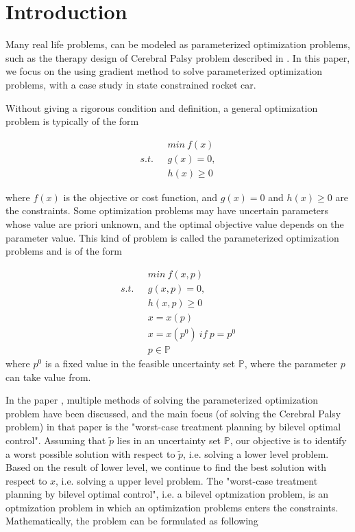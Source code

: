 

\section{Introduction}

Many real life problems, can be modeled as parameterized optimization problems, such as the therapy design of Cerebral Palsy problem described in \cite{MatSch22}. In this paper, we focus on the using gradient method to solve parameterized optimization problems, with a case study in state constrained rocket car. 

Without giving a rigorous condition and definition,  a general optimization problem is typically of the form

\begin{equation}
	\begin{aligned}
		 \  \  \ & min \  f(x) \\
		s.t.  \  \  \ & g(x) = 0, \\ 
		              &  h(x)  \geq  0 
	\end{aligned}
\end{equation}

where $f(x)$ is the objective or cost function, and $g(x) = 0$ and $h(x)  \geq  0$ are the constraints. Some optimization problems may have uncertain parameters whose value are priori unknown, and the optimal objective value depends on the parameter value. This kind of problem is called the parameterized optimization problems and is of the form 


\begin{equation}
	\begin{aligned}
		\  \  \ & min \  f(x, p) \\
		s.t.  \  \  \ & g(x, p) = 0, \\ 
		&  h(x,p)  \geq  0  \\ 
		& x = x(p) \\
		& x = x(p^0) \  if \  p = p^0 \\
		& p \in \mathbb{P}		
	\end{aligned}
\end{equation}
where $p^0$ is a fixed value in the feasible uncertainty set $\mathbb{P}$, where the parameter $p$ can take value from.

In the paper \cite{MatSch22}, multiple methods of solving the parameterized optimization problem have been discussed, and the main focus (of solving the  Cerebral Palsy problem) in that paper is the "worst-case treatment planning by bilevel optimal control". Assuming that $\tilde{p}$ lies in an uncertainty set $\mathbb{P}$, our objective is to identify a worst possible solution with respect to $\tilde{p}$, i.e. solving a lower level problem. Based on the result of lower level, we continue to find the best solution with respect to $x$, i.e. solving a upper level problem. The "worst-case treatment planning by bilevel optimal control", i.e. a  bilevel optmization problem, is an optmization problem in which an optimization problems enters the constraints. 
Mathematically, the problem can be formulated as following


